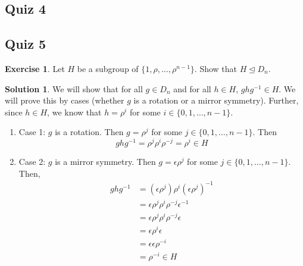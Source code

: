 \documentclass[12pt]{article}
\theoremstyle{definition}
\newcommand{\e}{\epsilon}
\newtheorem{exercise}{\color{YellowOrange}Exercise}
\theoremstyle{definition}
\newtheorem{solution}{\color{Goldenrod}Solution}
\begin{document}
\subsection{Quiz 4}

\subsection{Quiz 5}
\begin{exercise}
	Let $H$ be a subgroup of $\{1, \rho, \ldots, \rho^{n-1}\}$. Show that $H \trianglelefteq D_n$. 
\end{exercise}
\begin{solution}
	We will show that for all $g \in D_n$ and for all $h \in H$, $ghg^{-1} \in H$. We will prove this by cases (whether $g$ is a rotation or a mirror symmetry). Further, since $h \in H$, we know that $h = \rho^{i}$ for some $i \in \{0,1,\ldots, n-1\}$. 
	\begin{enumerate}
		\item Case 1: $g$ is a rotation. Then $g = \rho^j$ for some $j \in \{0,1,\ldots, n-1\}$. Then
		\begin{equation}
			ghg^{-1} = \rho^j \rho^i \rho^{-j} = \rho^i \in H
		\end{equation}
		\item Case 2: $g$ is a mirror symmetry. Then $g = \e \rho^j$ for some $j \in \{0,1,\ldots, n-1\}$. Then,
		\begin{align*}
			ghg^{-1} &= (\e \rho^j)\rho^i(\e \rho^j)^{-1} \\
			&= \e \rho^j \rho^i \rho^{-j} \e^{-1} \\
			&= \e \rho^j \rho^i \rho^{-j} \e \\
			&= \e \rho^i \e \\
			&= \e \e \rho^{-i} \\
			&= \rho^{-i} \in H \tag{since $H$ is a subgroup, contains inverses}
		\end{align*}
	\end{enumerate}
\end{solution}
\end{document}
